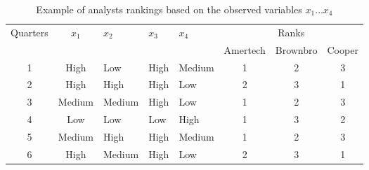 \documentclass{article}\usepackage[]{graphicx}\usepackage[]{color}
\newcommand{\ra}[1]{\renewcommand{\arraystretch}{#1}}
\begin{document}
%
%
%
%       
%
%
%
%
       
 \newpage
 \begin{table}
\centering
\ra{1.2}
\small\addtolength{\tabcolsep}{-1pt}
\caption{Example of analysts rankings based on the observed variables $x_1 \ldots x_4$ }
 \begin{tabular}{cclllccc}
\toprule
Quarters&$x_1$&$x_2$&$x_3$&$x_4$&\multicolumn{3}{c}{Ranks}\\
\cline{6-8}
&&&&&Amertech& Brownbro&Cooper\\
\midrule
1&High&Low&High&Medium&1& 2& 3\\
2&High&High&High&Low& 2& 3& 1\\
3&Medium&Medium&High&Low&1 &2& 3\\
4&Low&Low&Low&High&1& 3& 2\\
5&     Medium&        High&    High& Medium& 1 &2& 3\\
6&     High&       Medium&   High& Low& 2 &3& 1\\
\bottomrule
 \end{tabular} 
\label{tab01}
\end{table}
\end{document}

